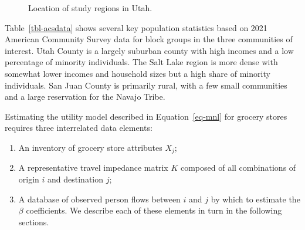 \documentclass[
  letterpaper,
  number,
  review,
  3p]{elsarticle}
\providecommand{\tightlist}{%
  \setlength{\itemsep}{0pt}\setlength{\parskip}{0pt}}\usepackage{longtable,booktabs,array}
\begin{document}
\begin{figure}


\caption{\label{fig-communities}Location of study regions in Utah.}

\end{figure}%

Table~\ref{tbl-acsdata} shows several key population statistics based on
2021 American Community Survey data for block groups in the three
communities of interest. Utah County is a largely suburban county with
high incomes and a low percentage of minority individuals. The Salt Lake
region is more dense with somewhat lower incomes and household sizes but
a high share of minority individuals. San Juan County is primarily
rural, with a few small communities and a large reservation for the
Navajo Tribe.

\begin{table}

\caption{\label{tbl-acsdata}Demographic Statistics of Study Regions}


\end{table}%

Estimating the utility model described in Equation~\ref{eq-mnl} for
grocery stores requires three interrelated data elements:

\begin{enumerate}
\def\labelenumi{\arabic{enumi}.}
\tightlist
\item
  An inventory of grocery store attributes \(X_j\);
\item
  A representative travel impedance matrix \(K\) composed of all
  combinations of origin \(i\) and destination \(j\);
\item
  A database of observed person flows between \(i\) and \(j\) by which
  to estimate the \(\beta\) coefficients. We describe each of these
  elements in turn in the following sections.
\end{enumerate}
\end{document}

